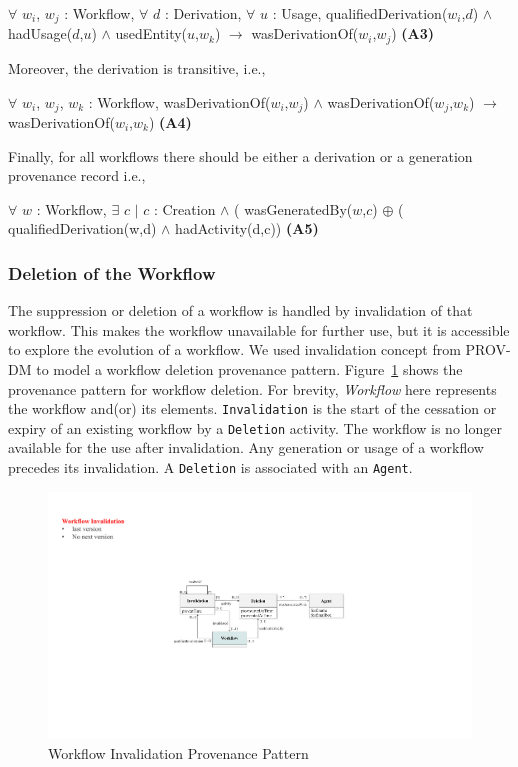 \documentclass[ao]{iosart2x}
\begin{document}
\begin{itemize}
\begin{center}
    $\forall$ $w_i$, $w_j$ : Workflow,
    $\forall$ $d$ : Derivation,
    $\forall$ $u$ : Usage,
    qualifiedDerivation($w_i$,$d$) $\wedge$ hadUsage($d$,$u$) $\wedge$ usedEntity($u$,$w_k$) $\rightarrow$ wasDerivationOf($w_i$,$w_j$) \textbf{(A3)}
\end{center}

Moreover, the derivation is transitive, i.e.,   
\begin{center}
    $\forall$ $w_i$, $w_j$, $w_k$ : Workflow,
    wasDerivationOf($w_i$,$w_j$) $\wedge$ wasDerivationOf($w_j$,$w_k$) $\rightarrow$ wasDerivationOf($w_i$,$w_k$) \textbf{(A4)}
\end{center}

Finally, for all workflows there should be either a derivation or a generation provenance record i.e., 

\begin{center}
    $\forall$ $w$ : Workflow,
    $\exists$ $c$ $\mid$ $c$ : Creation $\wedge$
     ( wasGeneratedBy($w$,$c$) $\oplus$ ( qualifiedDerivation(w,d) $\wedge$ hadActivity(d,c)) \textbf{(A5)}
\end{center}
\end{itemize}

\subsubsection{Deletion of the Workflow}
\label{subsec:workflow-deletion}

The suppression or deletion of a workflow is handled by invalidation of that workflow. 
This makes the workflow unavailable for further use, but it is accessible to explore the evolution of a workflow. We used invalidation concept from PROV-DM to model a workflow deletion provenance pattern. 
Figure~\ref{fig:workflow-deletion} shows the provenance pattern for workflow deletion. For brevity, \textit{Workflow} here represents the workflow and(or) its elements. \texttt{Invalidation} is the start of the cessation or expiry of an existing workflow by a \texttt{Deletion} activity. The workflow is no longer available for the use after invalidation. Any generation or usage of a workflow precedes its invalidation. A \texttt{Deletion} is associated with an \texttt{Agent}.

\begin{figure}[h]
    \centering
    \includegraphics[width=0.7\linewidth]{figures/workflow-deletion-pattern.pdf}
    \caption{Workflow Invalidation Provenance Pattern}
    \label{fig:workflow-deletion}
\end{figure}
\end{document}
